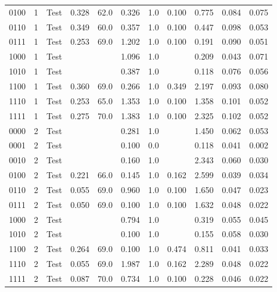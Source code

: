 \begin{longtable}{lllrrrrrrrr}
   0100 &       1 &  Test &    0.328 & 62.0 &     0.326 & 1.0 & 0.100 &          0.775 & 0.084 & 0.075 \\
   0110 &       1 &  Test &    0.349 & 60.0 &     0.357 & 1.0 & 0.100 &          0.447 & 0.098 & 0.053 \\
   0111 &       1 &  Test &    0.253 & 69.0 &     1.202 & 1.0 & 0.100 &          0.191 & 0.090 & 0.051 \\
   1000 &       1 &  Test &       &     &     1.096 & 1.0 &    &          0.209 & 0.043 & 0.071 \\
   1010 &       1 &  Test &       &     &     0.387 & 1.0 &    &          0.118 & 0.076 & 0.056 \\
   1100 &       1 &  Test &    0.360 & 69.0 &     0.266 & 1.0 & 0.349 &          2.197 & 0.093 & 0.080 \\
   1110 &       1 &  Test &    0.253 & 65.0 &     1.353 & 1.0 & 0.100 &          1.358 & 0.101 & 0.052 \\
   1111 &       1 &  Test &    0.275 & 70.0 &     1.383 & 1.0 & 0.100 &          2.325 & 0.102 & 0.052 \\
   0000 &       2 &  Test &       &     &     0.281 & 1.0 &    &          1.450 & 0.062 & 0.053 \\
   0001 &       2 &  Test &       &     &     0.100 & 0.0 &    &          0.118 & 0.041 & 0.002 \\
   0010 &       2 &  Test &       &     &     0.160 & 1.0 &    &          2.343 & 0.060 & 0.030 \\
   0100 &       2 &  Test &    0.221 & 66.0 &     0.145 & 1.0 & 0.162 &          2.599 & 0.039 & 0.034 \\
   0110 &       2 &  Test &    0.055 & 69.0 &     0.960 & 1.0 & 0.100 &          1.650 & 0.047 & 0.023 \\
   0111 &       2 &  Test &    0.050 & 69.0 &     0.100 & 1.0 & 0.100 &          1.632 & 0.048 & 0.022 \\
   1000 &       2 &  Test &       &     &     0.794 & 1.0 &    &          0.319 & 0.055 & 0.045 \\
   1010 &       2 &  Test &       &     &     0.100 & 1.0 &    &          0.155 & 0.058 & 0.030 \\
   1100 &       2 &  Test &    0.264 & 69.0 &     0.100 & 1.0 & 0.474 &          0.811 & 0.041 & 0.033 \\
   1110 &       2 &  Test &    0.055 & 69.0 &     1.987 & 1.0 & 0.162 &          2.289 & 0.048 & 0.022 \\
   1111 &       2 &  Test &    0.087 & 70.0 &     0.734 & 1.0 & 0.100 &          0.228 & 0.046 & 0.022 \\

\end{longtable}
